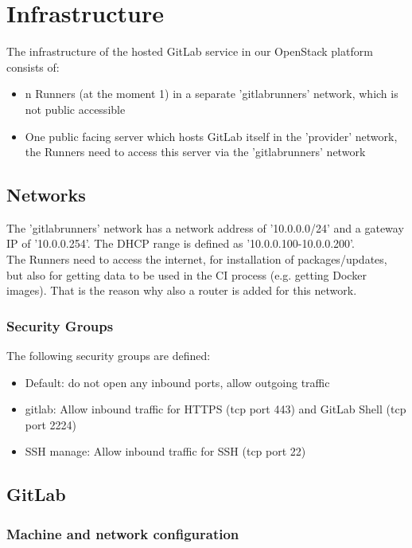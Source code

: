 \chapter{Infrastructure}

The infrastructure of the hosted GitLab service in our OpenStack platform consists of:
\begin{itemize}
    \item n Runners (at the moment 1) in a separate 'gitlabrunners' network, which is not public accessible
    \item One public facing server which hosts GitLab itself in the 'provider' network,
          the Runners need to access this server via the 'gitlabrunners' network
\end{itemize}

\section{Networks}

The 'gitlabrunners' network has a network address of '10.0.0.0/24' and a gateway IP of '10.0.0.254'.
The DHCP range is defined as '10.0.0.100-10.0.0.200'.\\

The Runners need to access the internet, for installation of packages/updates, but also for getting data to be used in the CI process (e.g. getting Docker images). 
That is the reason why also a router is added for this network.

\subsection{Security Groups}

The following security groups are defined:
\begin{itemize}
    \item Default: do not open any inbound ports, allow outgoing traffic
    \item gitlab: Allow inbound traffic for HTTPS (tcp port 443) and GitLab Shell (tcp port 2224)
	\item SSH manage: Allow inbound traffic for SSH (tcp port 22)
\end{itemize}

\section{GitLab}

\subsection{Machine and network configuration} \label{gitlab_machine_network_configuration}

